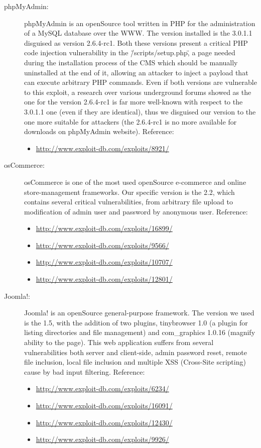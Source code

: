 \begin{description}
\item[phpMyAdmin: ] phpMyAdmin \cite{phpMyAdmin} is an openSource tool written in PHP for the administration of a MySQL database over the WWW. The version installed is the 3.0.1.1 disguised as version 2.6.4-rc1. Both these versions present a critical PHP code injection vulnerability in the \"/scripts/setup.php\", a page needed during the installation process of the CMS which should be manually uninstalled at the end of it, allowing an attacker to inject a payload that can execute arbitrary PHP commands. Even if both versions are vulnerable to this exploit, a research over various underground forums showed as the one for the version 2.6.4-rc1 is far more well-known with respect to the 3.0.1.1 one (even if they are identical), thus we disguised our version to the one more suitable for attackers (the 2.6.4-rc1 is no more available for downloads on phpMyAdmin website).
Reference:
\begin{itemize}
\item
\url{http://www.exploit-db.com/exploits/8921/}
\end{itemize}

\item[osCommerce: ] osCommerce \cite{osCommerce} is one of the most used openSource e-commerce and online store-management frameworks. Our specific version is the 2.2, which contains several critical vulnerabilities, from arbitrary file upload to modification of admin user and password by anonymous user.
Reference:
\begin{itemize}
\item
\url{http://www.exploit-db.com/exploits/16899/}
\item
\url{http://www.exploit-db.com/exploits/9566/}
\item
\url{http://www.exploit-db.com/exploits/10707/}
\item
\url{http://www.exploit-db.com/exploits/12801/}
\end{itemize}

\item[Joomla!: ] Joomla! \cite{joomla} is an openSource general-purpose framework. The version we used is the 1.5, with the addition of two plugins, tinybrowser 1.0 (a plugin for listing directories and file management) and com\_graphics 1.0.16 (magnify ability to the page). This web application suffers from several vulnerabilities both server and client-side, admin password reset, remote file inclusion, local file inclusion and multiple XSS (Cross-Site scripting) cause by bad input filtering.
Reference:
\begin{itemize}
\item
\url{http://www.exploit-db.com/exploits/6234/}
\item
\url{http://www.exploit-db.com/exploits/16091/}
\item
\url{http://www.exploit-db.com/exploits/12430/}
\item
\url{http://www.exploit-db.com/exploits/9926/}
\end{itemize}


\end{description}
